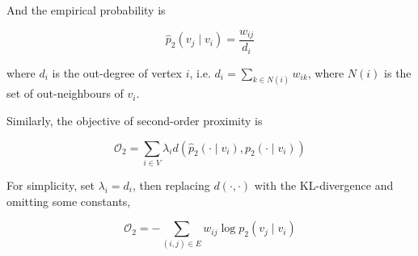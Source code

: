 \documentclass[]{article}
\begin{document}
And the empirical probability is

\begin{equation}
\hat{p}_2(v_j \mathop{|} v_i) = \frac{w_{ij}}{d_i}
\end{equation}

where \(d_i\) is the out-degree of vertex \(i\), i.e.
\(d_i = \sum_{k \in N(i)} w_{ik}\), where \(N(i)\) is the set of
out-neighbours of \(v_i\).

Similarly, the objective of second-order proximity is

\begin{equation}
\mathcal{O}_2 = \sum_{i \in V}\lambda_i d(\hat{p}_2(\cdot \mathop{|} v_i), p_2(\cdot \mathop{|} v_i))
\end{equation}

For simplicity, set \(\lambda_i = d_i\), then replacing
\(d(\cdot, \cdot)\) with the KL-divergence and omitting some constants,

\begin{equation}
\mathcal{O}_2 = - \sum_{(i,j) \in E} w_{ij}\log p_2(v_j \mathop{|} v_i)
\end{equation}




\end{document}
